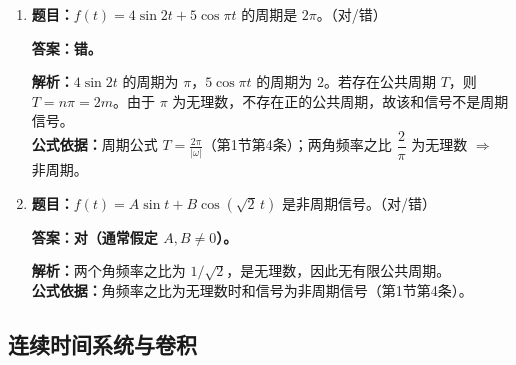 \documentclass[12pt,a4paper]{ctexart}
\begin{document}
\begin{enumerate}[label=\arabic*.]
\item \textbf{题目：}$f(t)=4\sin2t+5\cos\pi t$ 的周期是 $2\pi$。（对/错）\par
\textbf{答案：错。}\par
\textbf{解析：}$4\sin2t$ 的周期为 $\pi$，$5\cos\pi t$ 的周期为 $2$。若存在公共周期 $T$，则 $T=n\pi=2m$。由于 $\pi$ 为无理数，不存在正的公共周期，故该和信号不是周期信号。\\
\textbf{公式依据：}周期公式 $\displaystyle T=\frac{2\pi}{|\omega|}$（第1节第4条）；两角频率之比 $\dfrac{2}{\pi}$ 为无理数 $\Rightarrow$ 非周期。

\item \textbf{题目：}$f(t)=A\sin t+B\cos(\sqrt2\,t)$ 是非周期信号。（对/错）\par
\textbf{答案：对（通常假定 $A,B\ne0$）。}\par
\textbf{解析：}两个角频率之比为 $1/\sqrt2$，是无理数，因此无有限公共周期。\\
\textbf{公式依据：}角频率之比为无理数时和信号为非周期信号（第1节第4条）。
\end{enumerate}

\subsection{连续时间系统与卷积}
\end{document}
